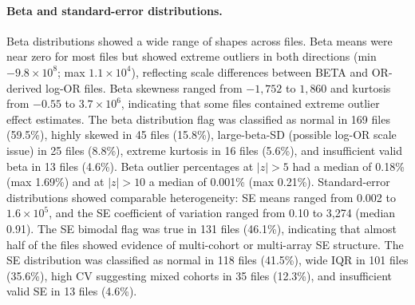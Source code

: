 \documentclass[11pt,a4paper]{article}
\begin{document}
\paragraph{Beta and standard-error distributions.}Beta distributions showed a wide range of shapes across files. Beta means were near zero for most files but showed extreme outliers in both directions (min $-9.8 \times 10^{8}$; max $1.1 \times 10^{4}$), reflecting scale differences between BETA and OR-derived log-OR files. Beta skewness ranged from $-1{,}752$ to $1{,}860$ and kurtosis from $-0.55$ to $3.7 \times 10^{6}$, indicating that some files contained extreme outlier effect estimates. The beta distribution flag was classified as normal in 169 files (59.5\%), highly skewed in 45 files (15.8\%), large-beta-SD (possible log-OR scale issue) in 25 files (8.8\%), extreme kurtosis in 16 files (5.6\%), and insufficient valid beta in 13 files (4.6\%). Beta outlier percentages at $|z| > 5$ had a median of 0.18\% (max 1.69\%) and at $|z| > 10$ a median of 0.001\% (max 0.21\%). Standard-error distributions showed comparable heterogeneity: SE means ranged from 0.002 to $1.6 \times 10^{5}$, and the SE coefficient of variation ranged from 0.10 to 3,274 (median 0.91). The SE bimodal flag was true in 131 files (46.1\%), indicating that almost half of the files showed evidence of multi-cohort or multi-array SE structure. The SE distribution was classified as normal in 118 files (41.5\%), wide IQR in 101 files (35.6\%), high CV suggesting mixed cohorts in 35 files (12.3\%), and insufficient valid SE in 13 files (4.6\%).
\end{document}
